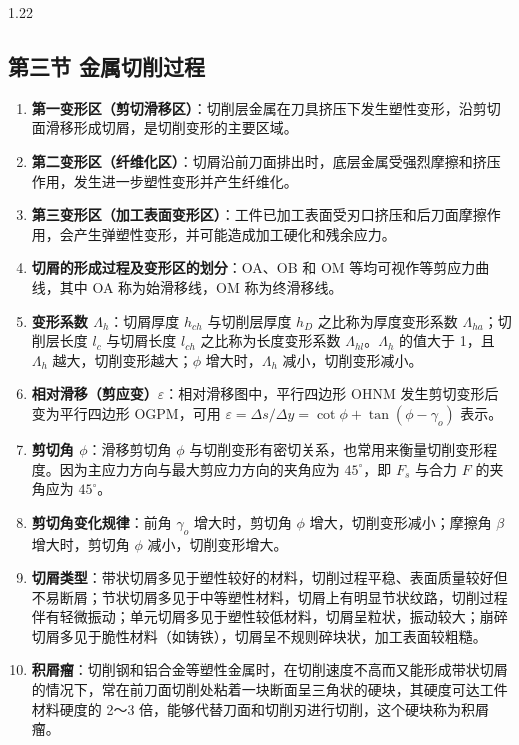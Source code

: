 \documentclass[12pt,a4paper]{article}
\begin{document}
\begin{spacing}{1.22}
\subsection{第三节 金属切削过程}
\begin{tcolorbox}[colback=yellow!6,colframe=red!55!black,title=重点,left=1mm,right=1mm]
\begin{enumerate}[leftmargin=2.2em,label=\arabic*.]
  \item \textbf{第一变形区（剪切滑移区）}：切削层金属在刀具挤压下发生塑性变形，沿剪切面滑移形成切屑，是切削变形的主要区域。
  \item \textbf{第二变形区（纤维化区）}：切屑沿前刀面排出时，底层金属受强烈摩擦和挤压作用，发生进一步塑性变形并产生纤维化。
  \item \textbf{第三变形区（加工表面变形区）}：工件已加工表面受刃口挤压和后刀面摩擦作用，会产生弹塑性变形，并可能造成加工硬化和残余应力。
  \item \textbf{切屑的形成过程及变形区的划分}：OA、OB 和 OM 等均可视作等剪应力曲线，其中 OA 称为始滑移线，OM 称为终滑移线。
  \item \textbf{变形系数 $\Lambda_h$}：切屑厚度 $h_{ch}$ 与切削层厚度 $h_D$ 之比称为厚度变形系数 $\Lambda_{ha}$；切削层长度 $l_c$ 与切屑长度 $l_{ch}$ 之比称为长度变形系数 $\Lambda_{hl}$。$\Lambda_h$ 的值大于 1，且 $\Lambda_h$ 越大，切削变形越大；$\phi$ 增大时，$\Lambda_h$ 减小，切削变形减小。
  \item \textbf{相对滑移（剪应变）$\varepsilon$}：相对滑移图中，平行四边形 OHNM 发生剪切变形后变为平行四边形 OGPM，可用 $\varepsilon=\Delta s/\Delta y=\cot\phi+\tan(\phi-\gamma_o)$ 表示。
  \item \textbf{剪切角 $\phi$}：滑移剪切角 $\phi$ 与切削变形有密切关系，也常用来衡量切削变形程度。因为主应力方向与最大剪应力方向的夹角应为 $45^\circ$，即 $F_s$ 与合力 $F$ 的夹角应为 $45^\circ$。
  \item \textbf{剪切角变化规律}：前角 $\gamma_o$ 增大时，剪切角 $\phi$ 增大，切削变形减小；摩擦角 $\beta$ 增大时，剪切角 $\phi$ 减小，切削变形增大。
  \item \textbf{切屑类型}：带状切屑多见于塑性较好的材料，切削过程平稳、表面质量较好但不易断屑；节状切屑多见于中等塑性材料，切屑上有明显节状纹路，切削过程伴有轻微振动；单元切屑多见于塑性较低材料，切屑呈粒状，振动较大；崩碎切屑多见于脆性材料（如铸铁），切屑呈不规则碎块状，加工表面较粗糙。
  \item \textbf{积屑瘤}：切削钢和铝合金等塑性金属时，在切削速度不高而又能形成带状切屑的情况下，常在前刀面切削处粘着一块断面呈三角状的硬块，其硬度可达工件材料硬度的 2～3 倍，能够代替刀面和切削刃进行切削，这个硬块称为积屑瘤。

\end{enumerate}
\end{tcolorbox}
\end{spacing}
\end{document}
